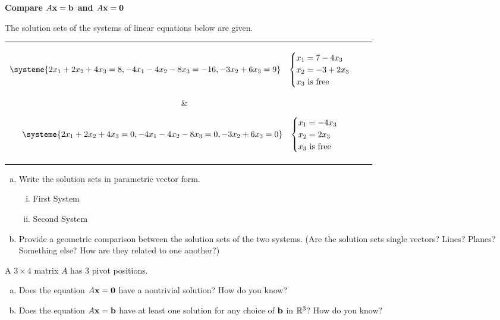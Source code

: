 \begin{exercise} %
	\textbf{Compare $A\boldsymbol{\mathbf{x}}=\boldsymbol{\mathbf{b}}$ and $A\boldsymbol{\mathbf{x}}=\boldsymbol{\mathbf{0}}$} \par
	The solution sets of the systems of linear equations below are given.
	
	\noindent	
	\begin{tabular}{c|c}
		\parbox{0.5\linewidth}{%
			\begin{align*}
			\systeme{2x_1+2x_2+4x_3=8,-4x_1-4x_2-8x_3=-16,-3x_2+6x_3=9}&&
			\begin{cases}x_1 = 7-4x_3 \\ x_2 =-3+2x_3 \\ x_3 \text{ is free}\end{cases}
			\end{align*}}
		&
		\parbox{0.5\linewidth}{%
			\begin{align*}
			\systeme{2x_1+2x_2+4x_3=0,-4x_1-4x_2-8x_3=0,-3x_2+6x_3=0}&&
			\begin{cases}x_1 = -4x_3 \\ x_2 =2x_3 \\ x_3 \text{ is free}\end{cases}
			\end{align*}}
	\end{tabular}
	
	\begin{enumerate}[(a)]
		\item Write the solution sets in parametric vector form.
		\begin{multicols}{2}
			\begin{enumerate}[(i)]
				\item First System
				\item Second System
			\end{enumerate}
		\end{multicols}
		\vfill
		\item Provide a geometric comparison between the solution sets of the two systems. (Are the solution sets single vectors? Lines? Planes? Something else? How are they related to one another?)
		\vspace{1in}
	\end{enumerate}
\end{exercise}

\begin{exercise} %
	A $3\times 4$ matrix $A$ has 3 pivot positions.
	\begin{multicols}{2}
		\begin{enumerate}[(a)]
			\item Does the equation $A\boldsymbol{\mathbf{x}}=\boldsymbol{\mathbf{0}}$ have a nontrivial solution? How do you know?
			\item Does the equation $A\boldsymbol{\mathbf{x}}=\boldsymbol{\mathbf{b}}$ have at least one solution for any choice of $\boldsymbol{\mathbf{b}}$ in $\mathbb{R}^3$? How do you know?
		\end{enumerate}
	\end{multicols}
\end{exercise}
\vfill


